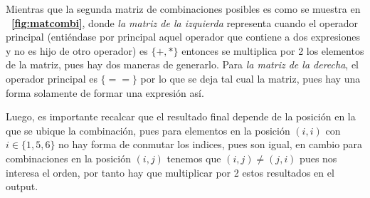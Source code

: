 \documentclass[letterpaper,10pt,table, dvipsnames]{article}
\newcommand{\figref}[1]{\figurename~\ref{#1}}
\begin{document}
\begin{enumerate}
\begin{table}[htbp]
\begin{minipage}[h]{0.4\linewidth}
\label{fig:matcombi}  
\end{minipage}
\end{table}

Mientras que la segunda matriz de combinaciones posibles es como se muestra en \textbf{\figref{fig:matcombi}}, donde \textit{la matriz de la izquierda} representa cuando el operador principal (entiéndase por principal aquel operador que contiene a dos expresiones y no es hijo de otro operador) es $\{+,*\}$ entonces se multiplica por 2 los elementos de la matriz, pues hay dos maneras de generarlo. Para \textit{la matriz de la derecha}, el operador principal es $\{==\}$ por lo que se deja tal cual la matriz, pues hay una forma solamente de formar una expresión así.

Luego, es importante recalcar que el resultado final depende de la posición en la que se ubique la combinación, pues para elementos en la posición $(i,i)$ con $i\in\{1,5,6\}$ no hay forma de conmutar los indices, pues son igual, en cambio para combinaciones en la posición $(i,j)$ tenemos que $(i,j)\neq (j,i)$ pues nos interesa el orden, por tanto hay que multiplicar por 2 estos resultados en el output.


\end{enumerate}
\end{document}

